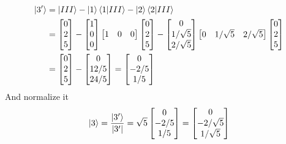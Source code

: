 \documentclass[../main.tex]{subfiles}
\begin{document}
\begin{align*}
	\ket{3'} & =\ket{III}-\ket{1}\braket{1|III}-\ket{2}\braket{2|III} \\
	         & =\begin{bmatrix}
		            0 \\2\\5
	            \end{bmatrix}-\begin{bmatrix}
		                          1 \\0\\0
	                          \end{bmatrix}
	\begin{bmatrix}
		1 & 0 & 0
	\end{bmatrix}
	\begin{bmatrix}
		0 \\2\\5
	\end{bmatrix}
	-
	\begin{bmatrix}
		0 \\1/\sqrt{5}\\2/\sqrt{5}
	\end{bmatrix}
	\begin{bmatrix}
		0 & 1/\sqrt{5} & 2/\sqrt{5}
	\end{bmatrix}
	\begin{bmatrix}
		0 \\2\\5
	\end{bmatrix}                                                    \\
	         & =\begin{bmatrix}
		            0 \\2\\5
	            \end{bmatrix}
	-
	\begin{bmatrix}
		0 \\12/5\\24/5
	\end{bmatrix}
	=
	\begin{bmatrix}
		0 \\-2/5\\1/5
	\end{bmatrix}
\end{align*}
And normalize it
\begin{equation*}
	\ket{3}=\frac{\ket{3'}}{|3'|}=\sqrt{5}\begin{bmatrix}
		0 \\-2/5\\1/5
	\end{bmatrix}
	=
	\begin{bmatrix}
		0 \\-2/\sqrt{5}\\1/\sqrt{5}
	\end{bmatrix}
\end{equation*}
\end{document}
